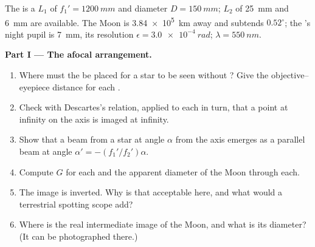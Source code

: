 \begin{problem}
\label{pb:b1:optical-instruments:1}
The  is a  $L_1$ of 
$f_1' = \qty{1200}{mm}$ and diameter $D = \qty{150}{mm}$; 
$L_2$ of  \qty{25}{mm} and \qty{6}{mm} are available. The
Moon is \qty{3.84e5}{km} away and subtends $0.52^\circ$; the 's
night pupil is \qty{7}{mm}, its resolution $\epsilon = \qty{3.0e-4}{rad}$;
$\lambda = \qty{550}{nm}$.

\medskip
\noindent\textbf{Part I --- The afocal arrangement.}
\begin{enumerate}
  \item Where must the  be placed for a star to be seen without
        ? Give the objective--eyepiece distance for each
        .
  \item Check with Descartes's relation, applied to each  in turn,
        that a point at infinity on the axis is imaged at infinity.
  \item Show that a beam from a star at angle $\alpha$ from the axis
        emerges as a parallel beam at angle $\alpha' = -(f_1'/f_2')\alpha$.
  \item Compute $G$ for each  and the apparent diameter of the
        Moon through each.
  \item The image is inverted. Why is that acceptable here, and what
        would a terrestrial spotting scope add?
  \item Where is the real intermediate image of the Moon, and what is
        its diameter? (It can be photographed there.)
\end{enumerate}


\end{problem}
